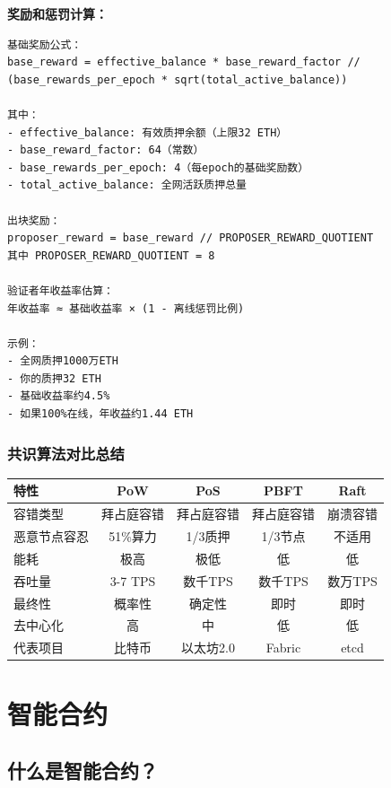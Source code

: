 ﻿\documentclass[12pt,a4paper]{article}
\begin{document}
\textbf{奖励和惩罚计算：}

\begin{lstlisting}
基础奖励公式：
base_reward = effective_balance * base_reward_factor // (base_rewards_per_epoch * sqrt(total_active_balance))

其中：
- effective_balance: 有效质押余额（上限32 ETH）
- base_reward_factor: 64（常数）
- base_rewards_per_epoch: 4（每epoch的基础奖励数）
- total_active_balance: 全网活跃质押总量

出块奖励：
proposer_reward = base_reward // PROPOSER_REWARD_QUOTIENT
其中 PROPOSER_REWARD_QUOTIENT = 8

验证者年收益率估算：
年收益率 ≈ 基础收益率 × (1 - 离线惩罚比例)

示例：
- 全网质押1000万ETH
- 你的质押32 ETH
- 基础收益率约4.5%
- 如果100%在线，年收益约1.44 ETH
\end{lstlisting}

\subsubsection{共识算法对比总结}

\begin{center}
\begin{tabular}{|l|c|c|c|c|}
\hline
\rowcolor{LightBG}
\textbf{特性} & \textbf{PoW} & \textbf{PoS} & \textbf{PBFT} & \textbf{Raft} \\
\hline
容错类型 & 拜占庭容错 & 拜占庭容错 & 拜占庭容错 & 崩溃容错 \\
\hline
恶意节点容忍 & 51\%算力 & 1/3质押 & 1/3节点 & 不适用 \\
\hline
能耗 & 极高 & 极低 & 低 & 低 \\
\hline
吞吐量 & 3-7 TPS & 数千TPS & 数千TPS & 数万TPS \\
\hline
最终性 & 概率性 & 确定性 & 即时 & 即时 \\
\hline
去中心化 & 高 & 中 & 低 & 低 \\
\hline
代表项目 & 比特币 & 以太坊2.0 & Fabric & etcd \\
\hline
\end{tabular}
\end{center}

\section{智能合约}

\subsection{什么是智能合约？}
\end{document}
